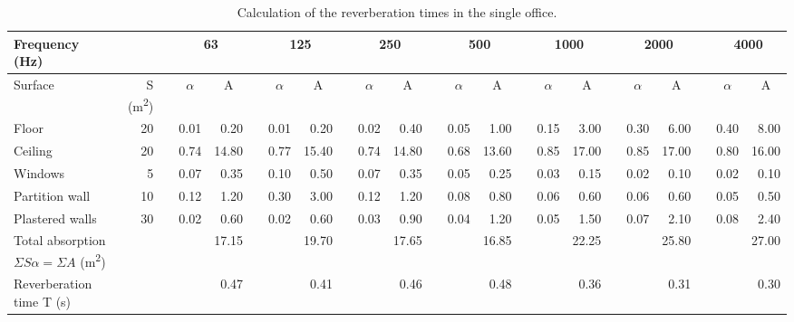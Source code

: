 \begin{sidewaystable}[htbp]
	\caption{Calculation of the reverberation times in the single office.}
	\label{tbl:reverb_office}
	\centering
	\begin{tabular}{@{}b{3cm}rrrrrrrrrrrrrrrrrrrrrr@{}}
		\toprule
		Frequency (Hz) & \multicolumn{1}{l}{} & \multicolumn{1}{l}{} & \multicolumn{2}{c}{63} & \multicolumn{1}{c}{} & \multicolumn{2}{c}{125} & \multicolumn{1}{c}{} & \multicolumn{2}{c}{250} & \multicolumn{1}{c}{} & \multicolumn{2}{c}{500} & \multicolumn{1}{c}{} & \multicolumn{2}{c}{1000} & \multicolumn{1}{c}{} & \multicolumn{2}{c}{2000} & \multicolumn{1}{c}{} & \multicolumn{2}{c}{4000} \\ \midrule
		Surface & S (m\textsuperscript{2}) & \multicolumn{1}{l}{} & \multicolumn{1}{c}{$\alpha$} & \multicolumn{1}{c}{A} & \multicolumn{1}{c}{} & \multicolumn{1}{c}{$\alpha$} & \multicolumn{1}{c}{A} & \multicolumn{1}{c}{} & \multicolumn{1}{c}{$\alpha$} & \multicolumn{1}{c}{A} & \multicolumn{1}{c}{} & \multicolumn{1}{c}{$\alpha$} & \multicolumn{1}{c}{A} & \multicolumn{1}{c}{} & \multicolumn{1}{c}{$\alpha$} & \multicolumn{1}{c}{A} & \multicolumn{1}{c}{} & \multicolumn{1}{c}{$\alpha$} & \multicolumn{1}{c}{A} & \multicolumn{1}{c}{} & \multicolumn{1}{c}{$\alpha$} & \multicolumn{1}{c}{A} \\
		Floor & 20 &  & 0.01 & 0.20 &  & 0.01 & 0.20 &  & 0.02 & 0.40 &  & 0.05 & 1.00 &  & 0.15 & 3.00 &  & 0.30 & 6.00 &  & 0.40 & 8.00 \\
		Ceiling & 20 &  & 0.74 & 14.80 &  & 0.77 & 15.40 &  & 0.74 & 14.80 &  & 0.68 & 13.60 &  & 0.85 & 17.00 &  & 0.85 & 17.00 &  & 0.80 & 16.00 \\
		Windows & 5 &  & 0.07 & 0.35 &  & 0.10 & 0.50 &  & 0.07 & 0.35 &  & 0.05 & 0.25 &  & 0.03 & 0.15 &  & 0.02 & 0.10 &  & 0.02 & 0.10 \\
		Partition wall & 10 &  & 0.12 & 1.20 &  & 0.30 & 3.00 &  & 0.12 & 1.20 &  & 0.08 & 0.80 &  & 0.06 & 0.60 &  & 0.06 & 0.60 &  & 0.05 & 0.50 \\
		Plastered walls & 30 &  & 0.02 & 0.60 &  & 0.02 & 0.60 &  & 0.03 & 0.90 &  & 0.04 & 1.20 &  & 0.05 & 1.50 &  & 0.07 & 2.10 &  & 0.08 & 2.40 \\ \midrule
		Total absorption $\Sigma S \alpha = \Sigma A$ (m\textsuperscript{2}) &  &  &  & 17.15 &  &  & 19.70 &  &  & 17.65 &  &  & 16.85 &  &  & 22.25 &  &  & 25.80 &  &  & 27.00 \\
		Reverberation time T (s) &  &  &  & 0.47 &  &  & 0.41 &  &  & 0.46 &  &  & 0.48 &  &  & 0.36 &  &  & 0.31 &  &  & 0.30 \\ \bottomrule
	\end{tabular}
\end{sidewaystable}